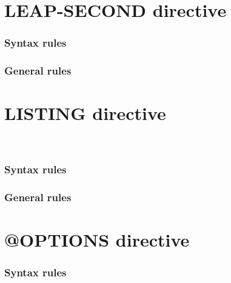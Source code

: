\section{LEAP-SECOND directive}

\begin{syntax}
\end{syntax}

\subsubsection{Syntax rules}

\subsubsection{General rules}

\section{LISTING directive}

\begin{syntax}
  \directiveindicator{}
  \begin{1=}
     \\
  \end{1=}
\end{syntax}

\subsubsection{Syntax rules}

\subsubsection{General rules}

\section{@OPTIONS directive}

\begin{syntax}[\miscextcolour]
\end{syntax}

\subsubsection{Syntax rules}

